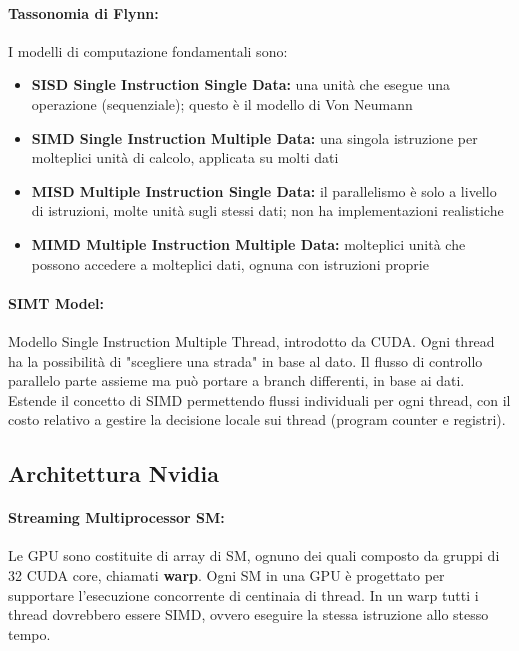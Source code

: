 \paragraph{Tassonomia di Flynn:} I modelli di computazione fondamentali sono: 
\begin{itemize}
	\item \textbf{SISD Single Instruction Single Data:} una unità che esegue una operazione (sequenziale); questo è il modello di Von Neumann
	
	\item \textbf{SIMD Single Instruction Multiple Data:} una singola istruzione per molteplici unità di calcolo, applicata su molti dati
	
	\item \textbf{MISD Multiple Instruction Single Data:} il parallelismo è solo a livello di istruzioni, molte unità sugli stessi dati; non ha implementazioni realistiche
	
	\item \textbf{MIMD Multiple Instruction Multiple Data:} molteplici unità che possono accedere a molteplici dati, ognuna con istruzioni proprie
\end{itemize}

\paragraph{SIMT Model:} Modello Single Instruction Multiple Thread, introdotto da CUDA. Ogni thread ha la possibilità di "scegliere una strada" in base al dato. Il flusso di controllo parallelo parte assieme ma può portare a branch differenti, in base ai dati. Estende il concetto di SIMD permettendo flussi individuali per ogni thread, con il costo relativo a gestire la decisione locale sui thread (program counter e registri).
\label{par:simt}

\subsection{Architettura Nvidia}

\paragraph{Streaming Multiprocessor SM:} Le GPU sono costituite di array di SM, ognuno dei quali composto da gruppi di 32 CUDA core, chiamati \textbf{warp}. Ogni SM in una GPU è progettato per supportare l'esecuzione concorrente di centinaia di thread. In un warp tutti i thread dovrebbero essere SIMD, ovvero eseguire la stessa istruzione allo stesso tempo.

